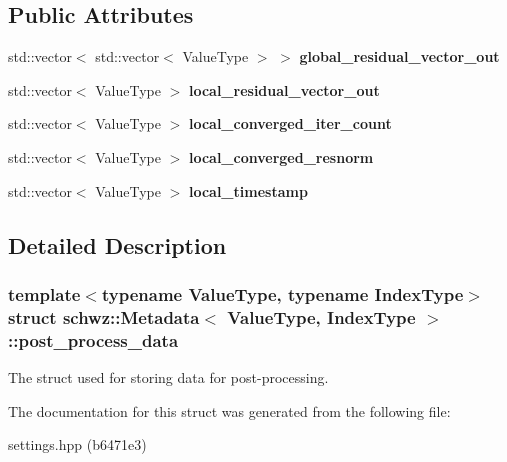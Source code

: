 \subsection*{Public Attributes}
\begin{DoxyCompactItemize}
\item 
\mbox{\label{structschwz_1_1Metadata_1_1post__process__data_a3cd4dc39548794213196924e925947e4}} 
std\+::vector$<$ std\+::vector$<$ Value\+Type $>$ $>$ {\bfseries global\+\_\+residual\+\_\+vector\+\_\+out}
\item 
\mbox{\label{structschwz_1_1Metadata_1_1post__process__data_ac508dd9baaf55fe3eefaac84a081ea07}} 
std\+::vector$<$ Value\+Type $>$ {\bfseries local\+\_\+residual\+\_\+vector\+\_\+out}
\item 
\mbox{\label{structschwz_1_1Metadata_1_1post__process__data_ae089ea8c22e004373eb6f53c2db01383}} 
std\+::vector$<$ Value\+Type $>$ {\bfseries local\+\_\+converged\+\_\+iter\+\_\+count}
\item 
\mbox{\label{structschwz_1_1Metadata_1_1post__process__data_af03f16caf28849a9b1946c52d7d628fb}} 
std\+::vector$<$ Value\+Type $>$ {\bfseries local\+\_\+converged\+\_\+resnorm}
\item 
\mbox{\label{structschwz_1_1Metadata_1_1post__process__data_ae314f010b4a16d0e1b103bf40099aa7d}} 
std\+::vector$<$ Value\+Type $>$ {\bfseries local\+\_\+timestamp}
\end{DoxyCompactItemize}


\subsection{Detailed Description}
\subsubsection*{template$<$typename Value\+Type, typename Index\+Type$>$\newline
struct schwz\+::\+Metadata$<$ Value\+Type, Index\+Type $>$\+::post\+\_\+process\+\_\+data}

The struct used for storing data for post-\/processing. 

The documentation for this struct was generated from the following file\+:\begin{DoxyCompactItemize}
\item 
settings.\+hpp (b6471e3)\end{DoxyCompactItemize}
